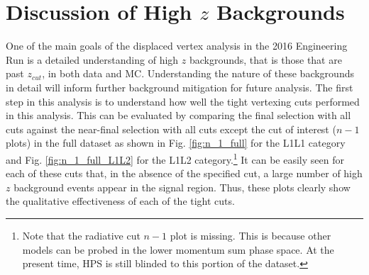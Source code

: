 
\clearpage

\section{Discussion of High $z$ Backgrounds}\label{sec:highz}

One of the main goals of the displaced vertex analysis in the 2016 Engineering Run is a detailed understanding of high $z$ backgrounds, that is those that are past $z_{cut}$, in both data and MC. Understanding the nature of these backgrounds in detail will inform further background mitigation for future analysis. The first step in this analysis is to understand how well the tight vertexing cuts performed in this analysis. This can be evaluated by comparing the final selection with all cuts against the near-final selection with all cuts except the cut of interest ($n-1$ plots) in the full dataset as shown in Fig. \ref{fig:n_1_full} for the L1L1 category and Fig. \ref{fig:n_1_full_L1L2} for the L1L2 category.\footnote{Note that the radiative cut $n-1$ plot is missing. This is because other models can be probed in the lower momentum sum phase space. At the present time, HPS is still blinded to this portion of the dataset.} It can be easily seen for each of these cuts that, in the absence of the specified cut, a large number of high $z$ background events appear in the signal region. Thus, these plots clearly show the qualitative effectiveness of each of the tight cuts. %

